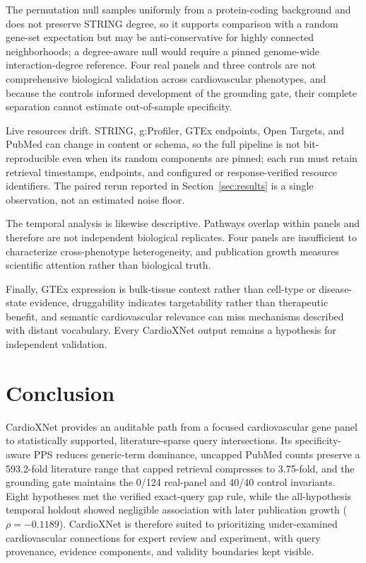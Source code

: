 \documentclass{ieeeaccess}
\begin{document}
The permutation null samples uniformly from a protein-coding background and does not preserve STRING degree, so it supports comparison with a random gene-set expectation but may be anti-conservative for highly connected neighborhoods; a degree-aware null would require a pinned genome-wide interaction-degree reference. Four real panels and three controls are not comprehensive biological validation across cardiovascular phenotypes, and because the controls informed development of the grounding gate, their complete separation cannot estimate out-of-sample specificity.

Live resources drift. STRING, g:Profiler, GTEx endpoints, Open Targets, and PubMed can change in content or schema, so the full pipeline is not bit-reproducible even when its random components are pinned; each run must retain retrieval timestamps, endpoints, and configured or response-verified resource identifiers. The paired rerun reported in Section~\ref{sec:results} is a single observation, not an estimated noise floor.

The temporal analysis is likewise descriptive. Pathways overlap within panels and therefore are not independent biological replicates. Four panels are insufficient to characterize cross-phenotype heterogeneity, and publication growth measures scientific attention rather than biological truth.

Finally, GTEx expression is bulk-tissue context rather than cell-type or disease-state evidence, druggability indicates targetability rather than therapeutic benefit, and semantic cardiovascular relevance can miss mechanisms described with distant vocabulary. Every CardioXNet output remains a hypothesis for independent validation.

\section{Conclusion}
CardioXNet provides an auditable path from a focused cardiovascular gene panel to statistically supported, literature-sparse query intersections. Its specificity-aware PPS reduces generic-term dominance, uncapped PubMed counts preserve a 593.2-fold literature range that capped retrieval compresses to 3.75-fold, and the grounding gate maintains the 0/124 real-panel and 40/40 control invariants. Eight hypotheses met the verified exact-query gap rule, while the all-hypothesis temporal holdout showed negligible association with later publication growth ($\rho=-0.1189$). CardioXNet is therefore suited to prioritizing under-examined cardiovascular connections for expert review and experiment, with query provenance, evidence components, and validity boundaries kept visible.
\end{document}
